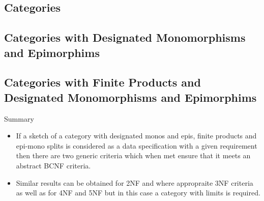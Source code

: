 \subsection{Categories}



\subsection{Categories with Designated Monomorphisms and Epimorphims}


\subsection{Categories with Finite Products and Designated Monomorphisms and Epimorphims}


\begin{frame}{Summary}
\begin{itemize}
\item If a sketch of a category with designated monos and epis, finite products and epi-mono splits is
 considered as a data specification with a given requirement then there are  two generic criteria which when met
 ensure that it meets an abstract BCNF criteria.
\item Similar results can be obtained for 2NF and where appropraite 3NF criteria as well as for 4NF and 5NF but in this case a category with limits is required.
\end{itemize}
\end{frame}
\fi



\iffalse
\subsection{Entity-Relationship Notation}

\fi

\iffalse
\subsection{Unused}

\fi

